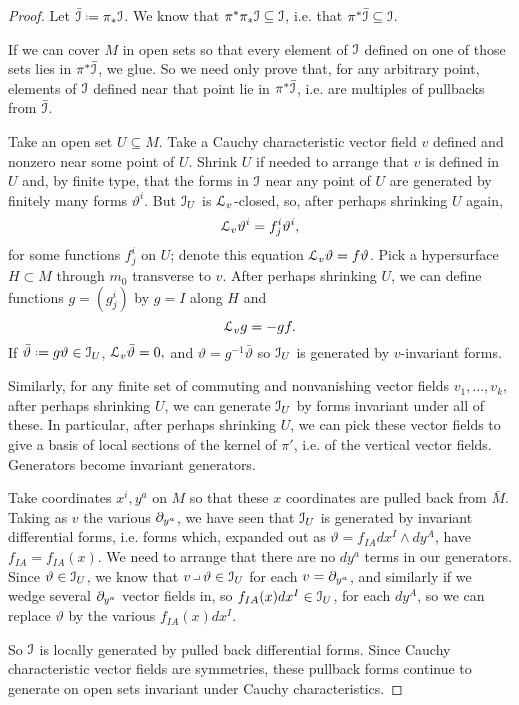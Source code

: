 \begin{proof}
Let \(\bar\II\defeq\pi_*\II\).
We know that \(\pi^*\pi_*\mathcal{I}\subseteq\mathcal{I}\), i.e. that \(\pi^*\bar{\mathcal{I}}\subseteq\mathcal{I}\).

If we can cover \(M\) in open sets so that every element of \(\mathcal{I}\) defined on one of those sets lies in \(\pi^*\bar{\mathcal{I}}\), we glue.
So we need only prove that, for any arbitrary point, elements of \(\mathcal{I}\) defined near that point lie in \(\pi^*\bar{\mathcal{I}}\), i.e. are multiples of pullbacks from \(\bar{\mathcal{I}}\).

Take an open set \(U\subseteq M\).
Take a Cauchy characteristic vector field \(v\) defined and nonzero near some point of \(U\).
Shrink \(U\) if needed to  arrange that \(v\) is defined in \(U\) and, 
by finite type, that the forms in \(\mathcal{I}\) near any point of \(U\) are generated by finitely many forms \(\vartheta^i\).
But \(\mathcal{I}_U\) is \(\EuScript L_v\)-closed, so, after perhaps shrinking \(U\) again,
\[
\EuScript L_v \vartheta^i = f^i_j \vartheta^i,
\]
for some functions \(f^i_j\) on \(U\); denote this equation \(\EuScript L_v \vartheta=f\vartheta\).
Pick a hypersurface \(H \subset M\) through \(m_0\) transverse to \(v\).
After perhaps shrinking \(U\), we can define functions \(g=(g^i_j)\) by \(g=I\) along \(H\) and 
\[
\EuScript L_v g = -gf.
\]
If \(\bar\vartheta\defeq g\vartheta\in\II_U\),
\(
\EuScript L_v \bar\vartheta=0,
\)
and \(\vartheta=g^{-1}\bar\vartheta\) so \(\mathcal{I}_U\) is generated by \(v\)-invariant forms.

Similarly, for any finite set of commuting and nonvanishing vector fields \(v_1,\dots,v_k\), after perhaps shrinking \(U\), we can generate \(\mathcal{I}_U\) by forms invariant under all of these.
In particular, after perhaps shrinking \(U\), we can pick these vector fields to give a basis of local sections of the kernel of \(\pi'\), i.e. of the vertical vector fields.
Generators become invariant generators.

Take coordinates \(x^i,y^a\) on \(M\) so that these \(x\) coordinates are pulled back from \(\bar{M}\).
Taking as \(v\) the various \(\partial_{y^a}\), we have seen that \(\mathcal{I}_U\) is generated by invariant differential forms, i.e. forms which, expanded out as \(\vartheta = f_{IA} dx^I \wedge dy^A\), have \(f_{IA} = f_{IA}(x)\).
We need to arrange that there are no \(dy^a\) terms in our generators.
Since \(\vartheta \in \mathcal{I}_U\), we know that \(v \hook \vartheta \in \II_U\) for each \(v=\partial_{y^a}\), and similarly if we wedge several \(\partial_{y^a}\) vector fields in, so \(f_{IA}(x) dx^I \in \mathcal{I}_U\), for each \(dy^A\), so we can replace \(\vartheta\) by the various \(f_{IA}(x) dx^I\).

So \(\mathcal{I}\) is locally generated by pulled back differential forms.
Since Cauchy characteristic vector fields are symmetries, these pullback forms continue to generate on open sets invariant under Cauchy characteristics.
\end{proof}
